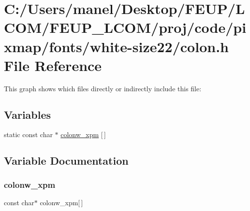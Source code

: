 \hypertarget{white-size22_2colon_8h}{}\section{C\+:/\+Users/manel/\+Desktop/\+F\+E\+U\+P/\+L\+C\+O\+M/\+F\+E\+U\+P\+\_\+\+L\+C\+O\+M/proj/code/pixmap/fonts/white-\/size22/colon.h File Reference}
\label{white-size22_2colon_8h}
This graph shows which files directly or indirectly include this file\+:
\subsection*{Variables}
\begin{DoxyCompactItemize}
\item 
static const char $\ast$ \mbox{\hyperlink{white-size22_2colon_8h_a05af7de2fa765b1101d350d5696d960f}{colonw\+\_\+xpm}} \mbox{[}$\,$\mbox{]}
\end{DoxyCompactItemize}


\subsection{Variable Documentation}
\mbox{\label{white-size22_2colon_8h_a05af7de2fa765b1101d350d5696d960f}} 
\subsubsection{\texorpdfstring{colonw\_xpm}{colonw\_xpm}}
{\footnotesize\ttfamily const char$\ast$ colonw\+\_\+xpm\mbox{[}$\,$\mbox{]}\hspace{0.3cm}{\ttfamily [static]}}

